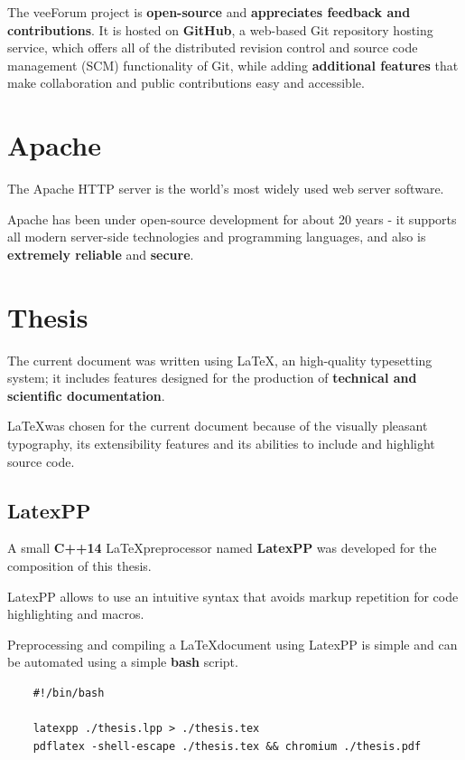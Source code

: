 \documentclass[12pt]{report}
\renewcommand\emph{\textbf}
\begin{document}
                The veeForum project is \emph{open-source} and \emph{appreciates feedback and contributions}. It is hosted on \emph{GitHub}, a web-based Git repository hosting service, which offers all of the distributed revision control and source code management (SCM) functionality of Git, while adding \emph{additional features} that make collaboration and public contributions easy and accessible.

            \section{Apache}
                The Apache HTTP server is the world's most widely used web server software.

                Apache has been under open-source development for about 20 years - it supports all modern server-side technologies and programming languages, and also is \emph{extremely reliable} and \emph{secure}.

            \section{Thesis}
                The current document was written using \LaTeX, an high-quality typesetting system; it includes features designed for the production of \emph{technical and scientific documentation}.

                \LaTeX was chosen for the current document because of the visually pleasant typography, its extensibility features and its abilities to include and highlight source code.

                \subsection{LatexPP}
                    A small \emph{C++14} \LaTeX preprocessor named \emph{LatexPP} was developed for the composition of this thesis.

                    LatexPP allows to use an intuitive syntax that avoids markup repetition for code highlighting and macros.

                    Preprocessing and compiling a \LaTeX document using LatexPP is simple and can be automated using a simple \emph{bash} script.

\begin{verbatim}
    #!/bin/bash

    latexpp ./thesis.lpp > ./thesis.tex
    pdflatex -shell-escape ./thesis.tex && chromium ./thesis.pdf
\end{verbatim}
\end{document}
